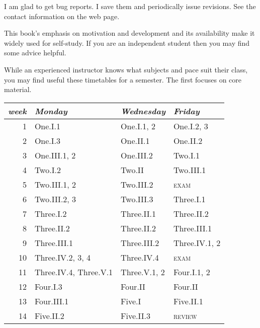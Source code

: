 {I am glad to get bug reports.
I save them and periodically issue revisions.
See the contact information on the web page.


\newcommand{\classday}[1]{\textsc{#1}}
\newcommand{\colwidth}{1.25in}

\medskip
{}
%
This book's emphasis on motivation and development
and its availability make it widely used for self-study.
If you are an independent student 
then you may find some advice helpful.

While an experienced instructor knows what subjects and
pace suit their class, you may find useful these
timetables for a semester.
The first focuses on core material.
\begin{center} \small
   \begin{tabular}{r|*{2}{p{\colwidth}}l}
      \textit{week}  
       &\textit{Monday}          
       &\textit{Wednesday}            
       &\textit{Friday}        \\ \hline
       1    &One.I.1         &One.I.1, 2        &One.I.2, 3         \\
       2    &One.I.3         &One.II.1          &One.II.2         \\
       3    &One.III.1, 2    &One.III.2         &Two.I.1         \\
       4    &Two.I.2         &Two.II            &Two.III.1         \\
       5    &Two.III.1, 2    &Two.III.2         &\classday{exam}          \\
       6    &Two.III.2, 3    &Two.III.3         &Three.I.1        \\
       7    &Three.I.2         &Three.II.1          &Three.II.2         \\
       8    &Three.II.2        &Three.II.2          &Three.III.1          \\
       9    &Three.III.1       &Three.III.2         &Three.IV.1, 2       \\
      10    &Three.IV.2, 3, 4  &Three.IV.4          &\classday{exam}          \\
      11    &Three.IV.4, Three.V.1 &Three.V.1, 2        &Four.I.1, 2         \\
      12    &Four.I.3         &Four.II            &Four.II       \\
      13    &Four.III.1       &Five.I             &Five.II.1         \\
      14    &Five.II.2        &Five.II.3          &\classday{review}        

\end{tabular}
\end{center}}
